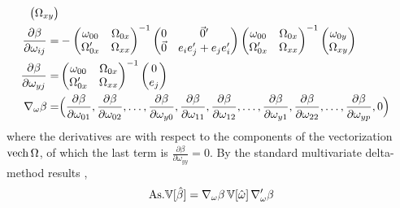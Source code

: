\documentclass[11pt]{asaproc}
\newcommand{\Var}{\mathbb{V}}
\begin{document}
\begin{align}
\begin{pmatrix}
        \Omega_{xy}
    \end{pmatrix}
    \notag \\
    \frac{\partial\beta}{\partial\omega_{ij}} = &
    -
    \begin{pmatrix}
        \omega_{00} & \Omega_{0x} \\
        \Omega_{0x}' & \Omega_{xx}
    \end{pmatrix}^{-1}
    \begin{pmatrix}
        0 & \vec{0}' \\
        \vec{0} & e_i e_j' + e_j e_i'
    \end{pmatrix}
    \begin{pmatrix}
        \omega_{00} & \Omega_{0x} \\
        \Omega_{0x}' & \Omega_{xx}
    \end{pmatrix}^{-1}
    \begin{pmatrix}
        \omega_{0y} \\
        \Omega_{xy}
    \end{pmatrix}
    \notag \\
    \frac{\partial\beta}{\partial\omega_{yj}} = &
    \begin{pmatrix}
        \omega_{00} & \Omega_{0x} \\
        \Omega_{0x}' & \Omega_{xx}
    \end{pmatrix}^{-1}
    \begin{pmatrix}
        0 \\
        e_j
    \end{pmatrix}
    \notag \\
    \nabla_\omega \beta = & \Bigl(
            \frac{\partial\beta}{\partial\omega_{01}}, \frac{\partial\beta}{\partial\omega_{02}}, \ldots,
            \frac{\partial\beta}{\partial\omega_{y0}},
            \frac{\partial\beta}{\partial\omega_{11}}, \frac{\partial\beta}{\partial\omega_{12}}, \ldots, \frac{\partial\beta}{\partial\omega_{y1}}, \frac{\partial\beta}{\partial\omega_{22}}, \ldots,
            \frac{\partial\beta}{\partial\omega_{yp}}, 0 \Bigr)
    \label{eq:dbeta:domega}
\end{align}
where the derivatives are with respect to the components of the vectorization $\mathop{\rm vech}\Omega$,
of which the last term is $\frac{\partial\beta}{\partial\omega_{yy}}=0$. By the standard multivariate
delta-method results \citep{newey:mcfadden:1994,vandervaart:1998},
\begin{equation}
    {\rm As.} \Var[ \hat\beta ] = \nabla_\omega \beta \, \Var[ \hat\omega ] \, \nabla_\omega' \beta
    \label{eq:asvar:beta-hat}
\end{equation}
\end{document}
